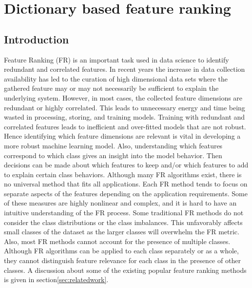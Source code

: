 \chapter{Dictionary based feature ranking}\label{ch:feature ranking}

\section{Introduction}

Feature Ranking (FR) is an important task used in data science to identify redundant and correlated features. In recent years the increase in data collection availability has led to the curation of high dimensional data sets where the gathered feature may or may not necessarily be sufficient to explain the underlying system. However, in most cases, the collected feature dimensions are redundant or highly correlated. This leads to unnecessary energy and time being wasted in processing, storing, and training models. Training with redundant and correlated features leads to inefficient and over-fitted models that are not robust. Hence identifying which feature dimensions are relevant is vital in developing a more robust machine learning model. Also, understanding which features correspond to which class gives an insight into the model behavior. Then decisions can be made about which features to keep and/or which features to add to explain certain class behaviors. Although many FR algorithms exist, there is no universal method that fits all applications. Each FR method tends to focus on separate aspects of the features depending on the application requirements. Some of these measures are highly nonlinear and complex, and it is hard to have an intuitive understanding of the FR process. Some traditional FR methods do not consider the class distributions or the class imbalances. This unfavorably affects small classes of the dataset as the larger classes will overwhelm the FR metric. Also, most FR methods cannot account for the presence of multiple classes. Although FR algorithms can be applied to each class separately or as a whole, they cannot distinguish feature relevance for each class in the presence of other classes. A discussion about some of the existing popular feature ranking methods is given in section\ref{sec:relatedwork}. 

